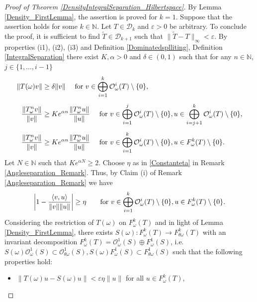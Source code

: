 \documentclass[pdflatex,sn-mathphys-num]{sn-jnl}%
\theoremstyle{thmstyleone}%
\theoremstyle{thmstyletwo}%
\theoremstyle{thmstylethree}%
\newcommand{\N}{\mathbb{N}}
\newcommand{\eps}{\varepsilon}
\numberwithin{equation}{section}
\begin{document}
\begin{proof}[Proof of Theorem \ref{DensityIntegralSeparation_Hilbertspace}]
By Lemma \ref{Density_FirstLemma}, the assertion is proved for $k=1$. Suppose that the assertion holds for some $k\in \N$.  Let $T\in \mathcal D_k$ and $\eps>0$ be arbitrary. To conclude the proof, it is sufficient to find $\widetilde T\in \mathcal D_{k+1}$ such that $\|\widetilde T-T\|_{\infty}<\eps$.  By properties (i1), (i2), (i3) and  Definition \ref{Dominatedsplliting}, Definition \ref{IntegralSeparation} there exist  $K,\alpha>0$ and $\delta\in (0,1)$ such that for any $n\in\N$, $j\in\{1,\dots,i-1\}$
\begin{align}
\|T(\omega)v\|& \geq \delta \|v\|
\quad \hbox{ for } v\in \bigoplus_{i=1}^{k} \mathcal O^i_{\omega}(T)\setminus\{0\},\label{Angleseparation_Eq1_New}\\[1ex]
\frac{\|T_{\omega}^n v\|}{\|v\|}
& \geq K e^{\alpha n}
    \frac{\|T_{\omega}^n u\|}{\|u\|}
\quad \hbox{ for } v\in \bigoplus_{i=1}^{j} \mathcal O^i_{\omega}(T)\setminus\{0\}, u\in \bigoplus_{i=j+1}^{k} \mathcal O^i_{\omega}(T)\setminus\{0\},\label{Integralseparation_New}\\[1ex]
\frac{\|T_{\omega}^n v\|}{\|v\|}
& \geq K e^{\alpha n}
    \frac{\|T_{\omega}^n u\|}{\|u\|}
\quad \hbox{ for } v\in \bigoplus_{i=1}^{k} \mathcal O^i_{\omega}(T)\setminus\{0\}, u\in F^{k}_{\omega}(T)\setminus\{0\}.\label{Speedseparation_New}
\end{align}
Let $N\in\N$ such that $Ke^{\alpha N}\geq 2$. Choose $\eta$ as in \eqref{Constanteta} in Remark \ref{Angleseparation_Remark}. Thus, by Claim (i) of Remark \ref{Angleseparation_Remark} we have 
 \begin{equation}\label{Angleseparation_Eq_Apply1}
\left|1- \frac{\langle v, u \rangle}{\|v\|\|u\|}\right|
\geq  
\eta\qquad \hbox{for } v\in \bigoplus_{i=1}^{k} \mathcal O^i_{\omega}(T)\setminus\{0\}, u\in F^{k}_{\omega}(T)\setminus\{0\}. 
\end{equation}
%
%
Considering the restriction of $T(\omega)$ on $F^k_{\omega}(T)$ and in light of Lemma \ref{Density_FirstLemma}, there exists $S(\omega): F^k_{\omega}(T)\rightarrow F^k_{\theta\omega}(T)$ with an invariant decomposition $F^k_{\omega}(T)=\mathcal O^1_{\omega}(S)\oplus F_{\omega}^1(S)$, i.e. $S(\omega)\mathcal O^1_{\omega}(S)\subset \mathcal O^1_{\theta\omega}(S), S(\omega) F^1_{\omega}(S)\subset F^1_{\theta\omega}(S)$ such that the following properties hold:
\begin{itemize}
    \item [(p1)] $\|T(\omega)u-S(\omega)u\|< \eps \eta\|u\|$ for all $u\in F_{\omega}^k(T)$,

\end{itemize}
\end{proof}
\end{document}
